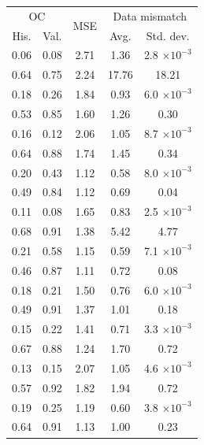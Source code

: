 \begin{tabular}{ccccc}
\toprule
\multicolumn{2}{c}{OC} & 
\multirow{2}{*}{
    MSE
} & 
\multicolumn{2}{c}{Data mismatch} 
\\
His. & Val. &  & Avg. & Std. dev.
\\
\midrule
0.06 & 0.08 & 2.71 & 1.36 & 2.8 $\times 10^{-3}$ \\
0.64 & 0.75 & 2.24 & 17.76 & 18.21 \\
\midrule
0.18 & 0.26 & 1.84 & 0.93 & 6.0 $\times 10^{-3}$ \\
0.53 & 0.85 & 1.60 & 1.26 & 0.30 \\
\midrule
0.16 & 0.12 & 2.06 & 1.05 & 8.7 $\times 10^{-3}$ \\
0.64 & 0.88 & 1.74 & 1.45 & 0.34 \\
\midrule
0.20 & 0.43 & 1.12 & 0.58 & 8.0 $\times 10^{-3}$ \\
0.49 & 0.84 & 1.12 & 0.69 & 0.04 \\
\midrule
0.11 & 0.08 & 1.65 & 0.83 & 2.5 $\times 10^{-3}$ \\
0.68 & 0.91 & 1.38 & 5.42 & 4.77 \\
\midrule
0.21 & 0.58 & 1.15 & 0.59 & 7.1 $\times 10^{-3}$ \\
0.46 & 0.87 & 1.11 & 0.72 & 0.08 \\
\midrule
0.18 & 0.21 & 1.50 & 0.76 & 6.0 $\times 10^{-3}$ \\
0.49 & 0.91 & 1.37 & 1.01 & 0.18 \\
\midrule
0.15 & 0.22 & 1.41 & 0.71 & 3.3 $\times 10^{-3}$ \\
0.67 & 0.88 & 1.24 & 1.70 & 0.72 \\
\midrule
0.13 & 0.15 & 2.07 & 1.05 & 4.6 $\times 10^{-3}$ \\
0.57 & 0.92 & 1.82 & 1.94 & 0.72 \\
\midrule
0.19 & 0.25 & 1.19 & 0.60 & 3.8 $\times 10^{-3}$ \\
0.64 & 0.91 & 1.13 & 1.00 & 0.23 \\
\bottomrule
\end{tabular}
